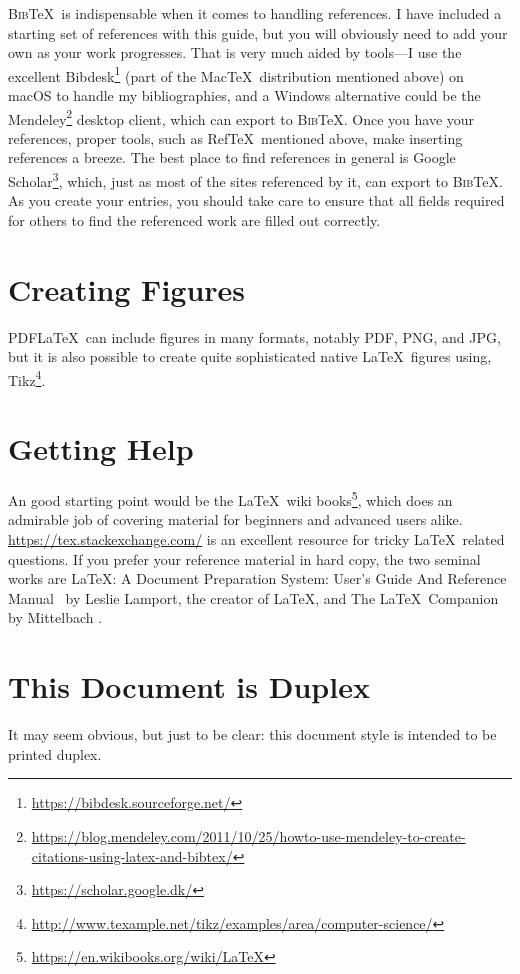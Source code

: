 \textsc{Bib}\negthinspace\TeX\ is indispensable when it comes to
handling references. I have included a starting set of references with
this guide, but you will obviously need to add your own as your work
progresses.  That is very much aided by tools---I use the excellent
Bibdesk\footnote{\url{https://bibdesk.sourceforge.net/}} (part of the
Mac\TeX\ distribution mentioned above) on macOS to handle my
bibliographies, and a Windows alternative could be the
Mendeley\footnote{\url{https://blog.mendeley.com/2011/10/25/howto-use-mendeley-to-create-citations-using-latex-and-bibtex/}}
desktop client, which can export to \textsc{Bib}\negthinspace\TeX.
Once you have your references, proper tools, such as Ref\TeX\
mentioned above, make inserting references a breeze.  The best place
to find references in general is Google
Scholar\footnote{\url{https://scholar.google.dk/}}, which, just as
most of the sites referenced by it, can export to
\textsc{Bib}\negthinspace\TeX. As you create your entries, you should
take care to ensure that all fields required for others to find the
referenced work are filled out correctly.

\section*{Creating Figures}
\label{sec:creating-figures}

PDF\LaTeX\ can include figures in many formats, notably \acs{PDF},
\acs{PNG}, and \acs{JPG}, but it is also possible to create quite
sophisticated native \LaTeX\ figures using, \eg
Tikz\footnote{\url{http://www.texample.net/tikz/examples/area/computer-science/}}.

\section*{Getting Help}
\label{sec:getting-help}

An good starting point would be the \LaTeX\ wiki
books\footnote{\url{https://en.wikibooks.org/wiki/LaTeX}}, which does
an admirable job of covering material for beginners and advanced users
alike.  \url{https://tex.stackexchange.com/} is an excellent resource
for tricky \LaTeX\ related questions. If you prefer your reference
material in hard copy, the two seminal works are \LaTeX: A Document
Preparation System: User's Guide And Reference
Manual~\cite{Lamport1994:LADPSUGARM1994} by Leslie Lamport, the creator of \LaTeX,
and The \LaTeX\ Companion~\cite{Mittelbach2004:TLC2004}
by Mittelbach \etal.

\section*{This Document is Duplex}
\label{sec:print-this-docum}

It may seem obvious, but just to be clear: this document style is intended to be printed duplex.


